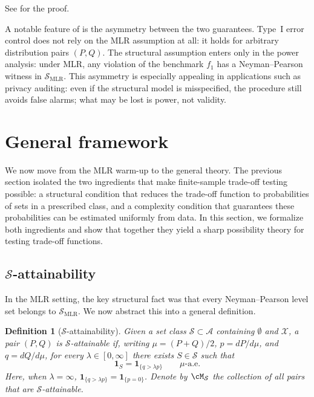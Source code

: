 \documentclass[english]{article}
\theoremstyle{plain}
\newtheorem{definition}{Definition}[section]
\theoremstyle{definition}
\newcommand{\falt}{f_1}
\newcommand{\smlr}{\mathcal{S}_{\mathrm{MLR}}}     %
\begin{document}
\noindent See  for the proof.
\medskip

A notable feature of  is the asymmetry between the two
guarantees. Type~I error control does not rely on the MLR assumption at all:
it holds for arbitrary distribution pairs $(P,Q)$. The structural assumption enters only in the power analysis: under MLR, any
violation of the benchmark $\falt$ has a Neyman--Pearson witness in
$\mathcal{S}_{\mathrm{MLR}}$.
This asymmetry is especially appealing in applications such as privacy
auditing: even if the structural model is misspecified, the procedure still
avoids false alarms; what may be lost is power, not validity.

\section{General framework}\label{sec:general}

We now move from the MLR warm-up to the general theory. The previous section
isolated the two ingredients that make finite-sample trade-off testing
possible: a structural condition that reduces the trade-off function to
probabilities of sets in a prescribed class, and a complexity condition that
guarantees these probabilities can be estimated uniformly from data. In this
section, we formalize both ingredients and show that together they yield a
sharp possibility theory for testing trade-off functions.

\subsection{$\mathcal{S}$-attainability}

In the MLR setting, the key structural fact was that every Neyman--Pearson
level set belongs to $\smlr$. We now abstract this into a general definition.



\begin{definition}[$\mathcal S$-attainability]\label{def:attainability}
Given a set class $\mathcal S \subset \mathcal A$ containing $\emptyset$ and $\mathcal X$, a pair
$(P,Q)$ is $\mathcal S$-attainable if, writing $\mu=(P+Q)/2$,
$p=dP/d\mu$, and $q=dQ/d\mu$, for every $\lambda \in [0,\infty]$ there exists
$S\in\mathcal S$ such that
\[
\mathbf 1_S = \mathbf 1_{\{q>\lambda p\}}
\qquad
\mu\text{-a.e.}
\]
Here, when $\lambda=\infty$, $\mathbf 1_{\{q>\lambda p\}}=\mathbf 1_{\{p=0\}}$.
Denote by $\cM_{\mathcal S}$ the collection of all pairs that are
$\mathcal S$-attainable.
\end{definition}
\end{document}
